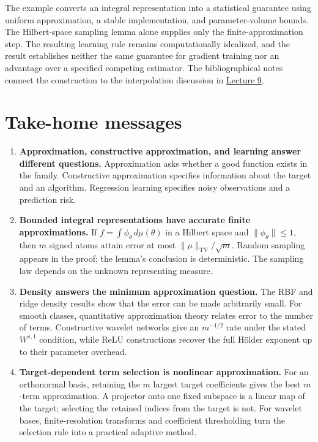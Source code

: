 \documentclass[11pt,twoside]{article}
\newcommand{\TV}{\operatorname{TV}}
\theoremstyle{definition}
\theoremstyle{remark}
\begin{document}
The example converts an integral representation into a statistical
guarantee using uniform approximation, a stable implementation, and
parameter-volume bounds. The Hilbert-space sampling lemma alone supplies
only the finite-approximation step. The resulting learning rule remains
computationally idealized, and the result establishes neither the same
guarantee for gradient training nor an advantage over a specified competing
estimator. The bibliographical notes connect the construction to the
interpolation discussion in \href{lecture09.pdf}{Lecture 9}.

\section{Take-home messages}

\begin{enumerate}[leftmargin=*]
\item \textbf{Approximation, constructive approximation, and learning answer
different questions.} Approximation asks whether a good function exists in
the family. Constructive approximation specifies information about the target
and an algorithm. Regression learning specifies noisy observations and a
prediction risk.

\item \textbf{Bounded integral representations have accurate finite
approximations.} If
\(f=\int\phi_\theta\,d\mu(\theta)\) in a Hilbert space and
\(\|\phi_\theta\|\leq1\), then \(m\) signed atoms attain error at most
\(\|\mu\|_{\TV}/\sqrt m\). Random sampling appears in the proof; the lemma's
conclusion is deterministic. The sampling law depends on the unknown
representing measure.

\item \textbf{Density answers the minimum approximation question.} The RBF
and ridge density results show that the error can be made arbitrarily small.
For smooth classes, quantitative approximation theory relates error to the
number of terms. Constructive wavelet networks give an \(m^{-1/2}\) rate under
the stated \(W^{s,1}\) condition, while ReLU constructions recover the full
H\"older exponent up to their parameter overhead.

\item \textbf{Target-dependent term selection is nonlinear approximation.}
For an orthonormal basis, retaining the \(m\) largest target coefficients gives
the best \(m\)-term approximation. A projector onto one fixed subspace is a
linear map of the target; selecting the retained indices from the target is
not. For wavelet bases, finite-resolution transforms and coefficient
thresholding turn the selection rule into a practical adaptive method.


\end{enumerate}
\end{document}
